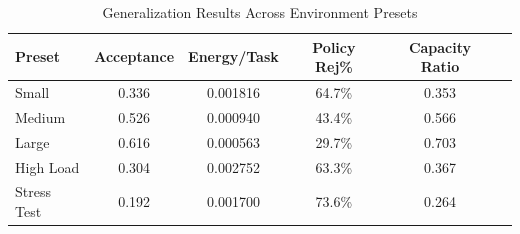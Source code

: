 \begin{table}[h]
\centering
\caption{Generalization Results Across Environment Presets}
\label{tab:generalization}
\begin{tabular}{lccccc}
\toprule
Preset & Acceptance & Energy/Task & Policy Rej\% & Capacity Ratio \\
\midrule
Small & 0.336 & 0.001816 & 64.7\% & 0.353 \\
Medium & 0.526 & 0.000940 & 43.4\% & 0.566 \\
Large & 0.616 & 0.000563 & 29.7\% & 0.703 \\
High Load & 0.304 & 0.002752 & 63.3\% & 0.367 \\
Stress Test & 0.192 & 0.001700 & 73.6\% & 0.264 \\
\bottomrule
\end{tabular}
\end{table}

